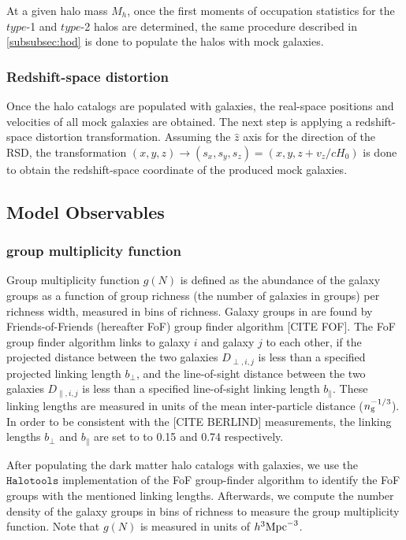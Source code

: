 \documentclass[14pt, preprint]{emulateapj}
\begin{document}
At a given halo mass $M_{h}$, once the first moments of occupation statistics for the $type$-1 and $type$-2 halos are determined, the same procedure described in \ref{subsubsec:hod} is done to populate the halos with mock galaxies.

\subsubsection{Redshift-space distortion}

Once the halo catalogs are populated with galaxies, the real-space positions and velocities of all mock galaxies are obtained. The next step is applying a redshift-space distortion transformation. Assuming the $\hat{z}$ axis for the direction of the RSD, the transformation $(x,y,z) \rightarrow (s_x,s_y,s_z) = (x , y ,z + v_z/cH_{0})$ is done to obtain the redshift-space coordinate of the produced mock galaxies.   

\subsection{Model Observables}
\subsubsection{group multiplicity function}
Group multiplicity function $g(N)$ is defined as the abundance of the galaxy groups as a 
function of group richness (the number of galaxies in groups) per richness width, measured in bins of richness. 
Galaxy groups in are found by Friends-of-Friends (hereafter FoF) group finder algorithm [CITE FOF]. 
The FoF group finder algorithm links to galaxy $i$ and galaxy $j$ to each other, if the projected distance between the two galaxies $D_{\perp , i,j}$ is less than a specified projected linking length $b{_\perp}$, and the line-of-sight distance between the two galaxies $D_{\parallel, i,j}$ is less than a specified line-of-sight linking length $b{_\parallel}$. These linking lengths are measured in units of the mean inter-particle distance ($n_{\rm g}^{-1/3}$). In order to be consistent with the [CITE BERLIND] measurements, the linking lengths $b_{\perp}$ and $b_{\parallel}$ are set to to 0.15 and 0.74 respectively. 

After populating the dark matter halo catalogs with galaxies, we use the $\mathtt{Halotools}$ implementation of the FoF group-finder algorithm to identify the FoF groups with the mentioned linking lengths. Afterwards, we compute the number density of the galaxy groups in bins of richness to measure the group multiplicity function. Note that $g(N)$ is measured in units of $h^{3}\rm{Mpc}^{-3}$.
\end{document}
